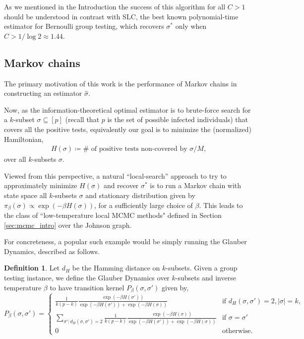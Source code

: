 \documentclass[12pt,reqno]{amsart}
\numberwithin{equation}{section}
\theoremstyle{definition}
\newtheorem{definition}[theorem]{Definition}
\renewcommand{\[}{\begin{equation}}
\renewcommand{\]}{\end{equation}}
\renewcommand{\|}{\bigg{|}}
\begin{document}
As we mentioned in the Introduction the success of this algorithm for all $C>1$ should be understood in contrast with SLC, the best known polynomial-time estimator for Bernoulli group testing, which recovers $\sigma^*$ only when $C>1/\log 2 \approx 1.44.$


\subsection{Markov chains}\label{sec:MCMC} The primary motivation of this work is the performance of Markov chains in constructing an estimator $\hat{\sigma}$. 

Now, as the information-theoretical optimal estimator is to brute-force search for a $k$-subset $\sigma \subseteq [p]$ (recall that $p$ is the set of possible infected individuals) that covers all the positive tests, equivalently our goal is to minimize the (normalized) Hamiltonian,
\begin{align}\label{eq:H} H(\sigma) \coloneqq \# \text{ of positive tests non-covered by }\sigma /M,
\end{align}
over all $k$-subsets $\sigma.$ 

Viewed from this perspective, a natural ``local-search'' approach to try to approximately minimize $H(\sigma)$ and recover $\sigma^*$ is to run a Markov chain with state space all $k$-subsets $\sigma$ and stationary distribution given by $\pi_{\beta}(\sigma) \propto \exp(-\beta H(\sigma))$, for a sufficiently large choice of $\beta.$ This leads to the class of ``low-temperature local MCMC methods" defined in Section \ref{sec:mcmc_intro} over the Johnson graph. 

For concreteness, a popular such example would be simply running the Glauber Dynamics, described as follows.

\begin{definition}\label{def:Glauber}
    Let $d_H$ be the Hamming distance on $k$-subsets. Given a group testing instance, we define the Glauber Dynamics over $k$-subsets and inverse temperature $\beta$ to have transition kernel $P_\beta(\sigma,\sigma')$ given by,
    \[P_{\beta}(\sigma, \sigma') = \begin{cases}
        \frac{1}{k(p-k)}\frac{\exp({-\beta H(\sigma')})}{\exp(-\beta H(\sigma'))+\exp(-\beta H(\sigma))} & \text{if } d_H(\sigma, \sigma') = 2, |\sigma| = k,\\
        \sum_{\sigma':d_H(\sigma,\sigma')=2}\frac{1}{k(p-k)}\frac{\exp({-\beta H(\sigma)})}{\exp(-\beta H(\sigma'))+\exp(-\beta H(\sigma))} & \text{if } \sigma = \sigma'\\
        0 & \text{otherwise}.
    \end{cases}\]
\end{definition}
\end{document}
